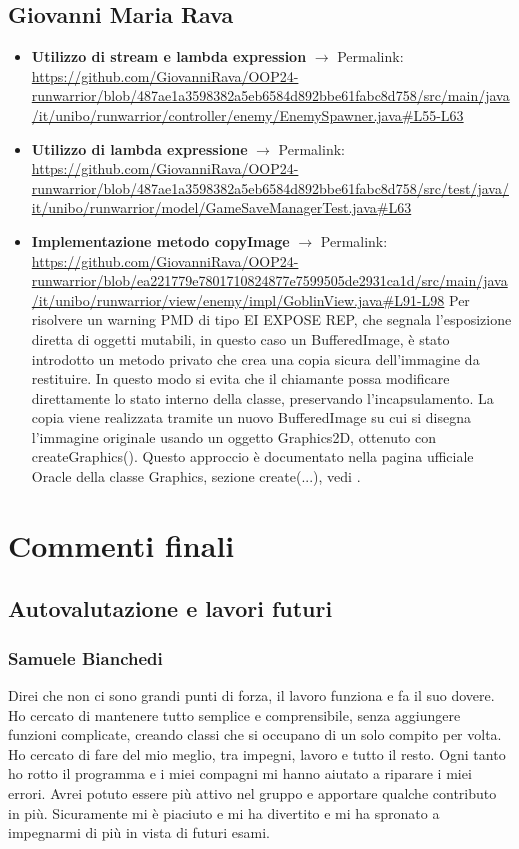 \documentclass[a4paper,12pt]{report}
\begin{document}
\section{Giovanni Maria Rava}
\begin{itemize}
    \item \textbf{Utilizzo di stream e lambda expression} $\rightarrow$ Permalink: 
    \url{https://github.com/GiovanniRava/OOP24-runwarrior/blob/487ae1a3598382a5eb6584d892bbe61fabc8d758/src/main/java/it/unibo/runwarrior/controller/enemy/EnemySpawner.java#L55-L63}
    \item \textbf{Utilizzo di lambda expressione} $\rightarrow$ Permalink:
    \url{https://github.com/GiovanniRava/OOP24-runwarrior/blob/487ae1a3598382a5eb6584d892bbe61fabc8d758/src/test/java/it/unibo/runwarrior/model/GameSaveManagerTest.java#L63}
    \item \textbf{Implementazione metodo copyImage} $\rightarrow$ Permalink:
    \url{https://github.com/GiovanniRava/OOP24-runwarrior/blob/ea221779e7801710824877e7599505de2931ca1d/src/main/java/it/unibo/runwarrior/view/enemy/impl/GoblinView.java#L91-L98}
    Per risolvere un warning PMD di tipo EI EXPOSE REP, che segnala l'esposizione diretta di oggetti mutabili, in questo caso un BufferedImage, è stato introdotto un metodo privato 
    che crea una copia sicura dell'immagine da restituire. In questo modo si evita che il chiamante possa modificare direttamente lo stato interno della classe, preservando l'incapsulamento.
    La copia viene realizzata tramite un nuovo BufferedImage su cui si disegna l'immagine originale usando un oggetto Graphics2D, 
    ottenuto con createGraphics(). Questo approccio è documentato nella pagina ufficiale Oracle della classe Graphics, sezione 
    create(...), vedi \cite{oracle-graphics-create}.
\end{itemize}

\chapter{Commenti finali}
\section{Autovalutazione e lavori futuri}
\subsection{Samuele Bianchedi}
Direi che non ci sono grandi punti di forza, il lavoro funziona e fa il suo dovere. Ho cercato di mantenere tutto semplice e comprensibile,
senza aggiungere funzioni complicate, creando classi che si occupano di un solo compito per volta.
Ho cercato di fare del mio meglio, tra impegni, lavoro e tutto il resto. Ogni tanto ho rotto il programma e i miei compagni mi hanno aiutato
a riparare i miei errori. Avrei potuto essere più attivo nel gruppo e apportare qualche contributo in più.
Sicuramente mi è piaciuto e mi ha divertito e mi ha spronato a impegnarmi di più in vista di futuri esami.
\end{document}
